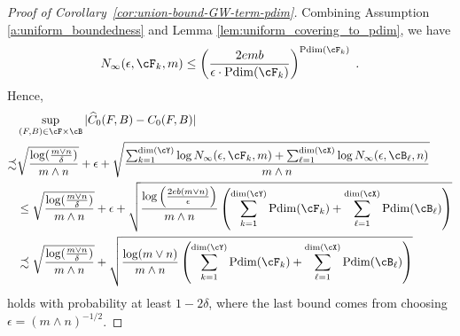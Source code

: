 \documentclass[11pt]{article}
\begin{document}
\begin{proof}[Proof of Corollary~\ref{cor:union-bound-GW-term-pdim}]
	Combining Assumption \ref{a:uniform_boundedness} and Lemma \ref{lem:uniform_covering_to_pdim}, we have
	\begin{equation*}
		N_\infty(\epsilon, \cF_k, m) \le \left( \frac{2 e m b}{\epsilon \cdot {\rm Pdim}(\cF_{k})} \right)^{{\rm Pdim}(\cF_{k})} \;.
	\end{equation*}
	Hence,
	\begin{equation*}
		\begin{split}
			& \sup_{(F, B) \in \cF \times \cB} |\widehat{C}_0(F, B) - C_0(F, B)| \\
			\precsim
			& \sqrt{\frac{\log(\tfrac{m \vee n}{\delta})}{m \wedge n}} + \epsilon + \sqrt{\frac{\sum_{k = 1}^{\mathrm{dim}(\cY)} \log N_{\infty}(\epsilon, \cF_k, m) + \sum_{\ell = 1}^{\mathrm{dim}(\cX)} \log N_{\infty}(\epsilon, \cB_\ell, n)}{m \wedge n}} \\
			& \le \sqrt{\frac{\log(\tfrac{m \vee n}{\delta})}{m \wedge n}} + \epsilon + \sqrt{\frac{\log\left(\tfrac{2e b (m \vee n)}{\epsilon}\right)}{m \wedge n} \left( \sum_{k =1}^{{\rm dim}(\cY)} {\rm Pdim}(\cF_{k}) + \sum_{\ell = 1}^{{\rm dim}(\cX)} {\rm Pdim}(\cB_{\ell})\right)} \\
			& \precsim \sqrt{\frac{\log(\tfrac{m \vee n}{\delta})}{m \wedge n}} + \sqrt{\frac{\log(m \vee n)}{m\wedge n} \left( \sum_{k =1}^{{\rm dim}(\cY)} {\rm Pdim}(\cF_{k}) + \sum_{\ell = 1}^{{\rm dim}(\cX)} {\rm Pdim}(\cB_{\ell}) \right)} 
		\end{split}
	\end{equation*}
	holds with probability at least $1 - 2 \delta$, where the last bound comes from choosing $\epsilon = (m \wedge n)^{- 1 / 2}$.
\end{proof}
\end{document}
